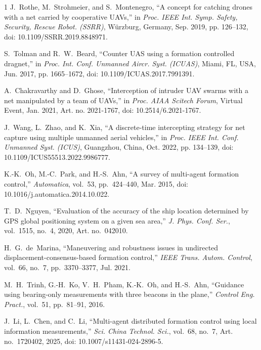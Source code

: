 \documentclass[letterpaper,journal]{IEEEtran}
\theoremstyle{plain}
\theoremstyle{definition}
\theoremstyle{remark}
\begin{document}
\begin{thebibliography}{1}
J.~Rothe, M.~Strohmeier, and S.~Montenegro, ``A concept for catching drones with a net carried by cooperative UAVs,'' in \textit{Proc. IEEE Int. Symp. Safety, Security, Rescue Robot. (SSRR)}, W\"{u}rzburg, Germany, Sep. 2019, pp. 126--132, doi: 10.1109/SSRR.2019.8848971.

S.~Tolman and R.~W.~Beard, ``Counter UAS using a formation controlled dragnet,'' in \textit{Proc. Int. Conf. Unmanned Aircr. Syst. (ICUAS)}, Miami, FL, USA, Jun. 2017, pp. 1665--1672, doi: 10.1109/ICUAS.2017.7991391.

A.~Chakravarthy and D.~Ghose, ``Interception of intruder UAV swarms with a net manipulated by a team of UAVs,'' in \textit{Proc. AIAA Scitech Forum}, Virtual Event, Jan. 2021, Art. no. 2021-1767, doi: 10.2514/6.2021-1767.

J.~Wang, L.~Zhao, and K.~Xia, ``A discrete-time intercepting strategy for net capture using multiple unmanned aerial vehicles,'' in \textit{Proc. IEEE Int. Conf. Unmanned Syst. (ICUS)}, Guangzhou, China, Oct. 2022, pp. 134--139, doi: 10.1109/ICUS55513.2022.9986777.

K.-K.~Oh, M.-C.~Park, and H.-S.~Ahn, ``A survey of multi-agent formation control,'' \textit{Automatica}, vol.~53, pp.~424--440, Mar. 2015, doi: 10.1016/j.automatica.2014.10.022.

T.~D.~Nguyen, ``Evaluation of the accuracy of the ship location determined by GPS global positioning system on a given sea area,'' \textit{J. Phys. Conf. Ser.}, vol.~1515, no.~4, 2020, Art. no.~042010.

H.~G.~de~Marina, ``Maneuvering and robustness issues in undirected displacement-consensus-based formation control,'' \textit{IEEE Trans. Autom. Control}, vol.~66, no.~7, pp.~3370--3377, Jul. 2021.

M.~H.~Trinh, G.-H.~Ko, V.~H.~Pham, K.-K.~Oh, and H.-S.~Ahn, ``Guidance using bearing-only measurements with three beacons in the plane,'' \textit{Control Eng. Pract.}, vol.~51, pp.~81--91, 2016.

J.~Li, L.~Chen, and C.~Li, ``Multi-agent distributed formation control using local information measurements,'' \textit{Sci. China Technol. Sci.}, vol.~68, no.~7, Art. no.~1720402, 2025, doi: 10.1007/s11431-024-2896-5.


\end{thebibliography}
\end{document}
